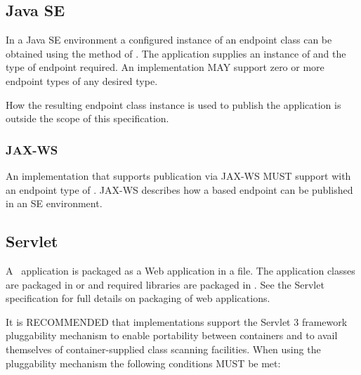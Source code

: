 \subsection{Java SE}

In a Java SE environment a configured instance of an endpoint class can be obtained using the  method of \rd. The application supplies an instance of  and the type of endpoint required. An implementation MAY support zero or more endpoint types of any desired type.

How the resulting endpoint class instance is used to publish the application is outside the scope of this specification.

\subsubsection{JAX-WS}

An implementation that supports publication via JAX-WS MUST support  with an endpoint type of . JAX-WS describes how a  based endpoint can be published in an SE environment.

\subsection{Servlet}
\label{servlet}

A \jaxrs\ application is packaged as a Web application in a  file. The application classes are packaged in  or  and required libraries are packaged in . See the Servlet specification for full details on packaging of web applications.

It is RECOMMENDED that implementations support the Servlet 3 framework pluggability mechanism to enable portability between containers and to avail themselves of container-supplied class scanning facilities. When using the pluggability mechanism the following conditions MUST be met:

